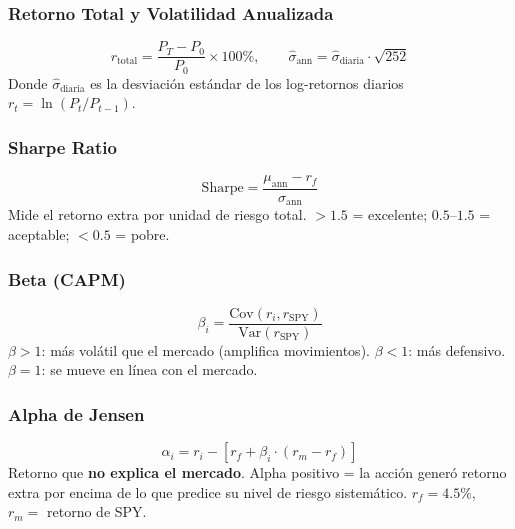 \documentclass[11pt, a4paper]{article}
\begin{document}
\subsubsection{Retorno Total y Volatilidad Anualizada}

\begin{formulabox}
  \[ r_{\text{total}} = \frac{P_T - P_0}{P_0} \times 100\%, \qquad \hat{\sigma}_{\text{ann}} = \hat{\sigma}_{\text{diaria}} \cdot \sqrt{252} \]
  Donde $\hat{\sigma}_{\text{diaria}}$ es la desviación estándar de los log-retornos diarios $r_t = \ln(P_t/P_{t-1})$.
\end{formulabox}

\subsubsection{Sharpe Ratio}

\begin{formulabox}[{Sharpe Ratio (con $r_f = 4.5\%$)}]
  \[ \text{Sharpe} = \frac{\mu_{\text{ann}} - r_f}{\sigma_{\text{ann}}} \]
  Mide el retorno extra por unidad de riesgo total. $> 1.5$ = excelente; $0.5$--$1.5$ = aceptable; $< 0.5$ = pobre.
\end{formulabox}

\subsubsection{Beta (CAPM)}

\begin{formulabox}[Beta vs S\&P 500]
  \[ \beta_i = \frac{\text{Cov}(r_i, r_{\text{SPY}})}{\text{Var}(r_{\text{SPY}})} \]
  $\beta > 1$: más volátil que el mercado (amplifica movimientos). $\beta < 1$: más defensivo. $\beta = 1$: se mueve en línea con el mercado.
\end{formulabox}

\subsubsection{Alpha de Jensen}

\begin{formulabox}
  \[ \alpha_i = r_i - \left[r_f + \beta_i \cdot (r_m - r_f)\right] \]
  Retorno que \textbf{no explica el mercado}. Alpha positivo = la acción generó retorno extra por encima de lo que predice su nivel de riesgo sistemático. $r_f = 4.5\%$, $r_m = $ retorno de SPY.
\end{formulabox}
\end{document}
